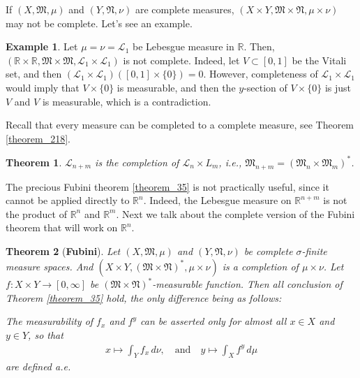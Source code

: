 \documentclass[11pt]{book}
\newtheorem{theorem}{Theorem}[chapter]
\theoremstyle{definition}
\newtheorem{example}{Example}[chapter]
\numberwithin{equation}{chapter}
\def\L{{\mathcal L}}
\begin{document}
\medskip

If $(X,\mathfrak{M},\mu)$ and $(Y,\mathfrak{N},\nu)$ are complete measures, $(X \times Y,\mathfrak{M} \times \mathfrak{N},\mu \times \nu)$ may not be complete. Let's see an example.

\medskip

\begin{example}\label{example_32}
Let $\mu = \nu = \L_1$ be Lebesgue measure in $\mathbb{R}$. Then, $(\mathbb{R} \times \mathbb{R},\mathfrak{M} \times \mathfrak{M},\L_1 \times \L_1)$ is not complete. Indeed, let $V \subset [0,1]$ be the Vitali set, and then $(\L_1 \times \L_1)([0,1] \times \{0\}) = 0$. However, completeness of $\L_1 \times \L_1$ would imply that $V \times \{0\}$ is measurable, and then the $y$-section of $V \times \{0\}$ is just $V$ and $V$ is measurable, which is a contradiction. 
\end{example}

\medskip

Recall that every measure can be completed to a complete measure, see Theorem \ref{theorem_218}.

\medskip

\begin{theorem}
$\L_{n+m}$ is the completion of $\L_n \times L_m$, i.e., $\mathfrak{M}_{n+m} = \left(\mathfrak{M}_n \times \mathfrak{M}_m\right)^*$.
\end{theorem}

\medskip

The precious Fubini theorem \ref{theorem_35} is not practically useful, since it cannot be applied directly to $\mathbb{R}^n$. Indeed, the Lebesgue measure on $\mathbb{R}^{n+m}$ is not the product of $\mathbb{R}^{n}$
and $\mathbb{R}^{m}$. Next we talk about the complete version of the Fubini theorem that will work on $\mathbb{R}^n$.

\medskip

\begin{theorem}[{\bf Fubini}]\label{theorem_37}
Let $(X,\mathfrak{M},\mu)$ and $(Y,\mathfrak{N},\nu)$ be complete $\sigma$-finite measure spaces. And $(X \times Y, (\mathfrak{M} \times \mathfrak{N})^*, \mu \times \nu)$ is a completion of $\mu \times \nu$. Let $f: X \times Y \to [0,\infty]$ be $(\mathfrak{M} \times \mathfrak{N})^*$-measurable function. Then all conclusion of Theorem \ref{theorem_35} hold, the only difference being as follows:

The measurability of $f_x$ and $f^y$ can be asserted only for almost all $x \in X$ and $y \in Y$, so that 
\begin{align}\label{theorem_37_equ1}
    x \mapsto \int_Y f_x\, d\nu, \quad \text{and} \quad y \mapsto \int_X f^y\, d\mu
\end{align}
are defined a.e.
\end{theorem}
\end{document}
